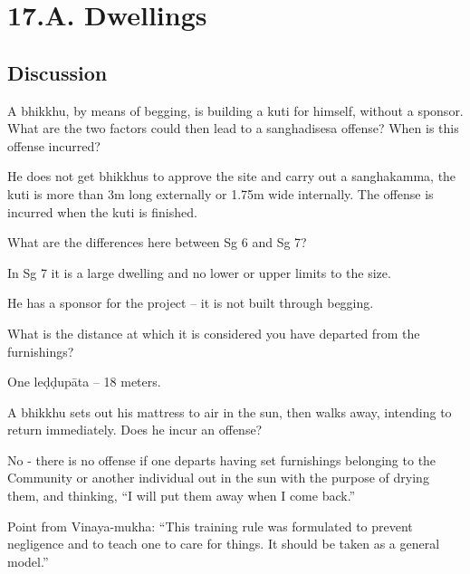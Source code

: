\chapter{17.A. Dwellings}
\renewcommand*{\theChapterTitle}{17.A. Dwellings}

\section*{Discussion}


A bhikkhu, by means of begging, is building a kuti for himself, without a
sponsor. What are the two factors could then lead to a sanghadisesa offense?
When is this offense incurred?

\begin{solution}
  He does not get bhikkhus to approve the site and carry out a sanghakamma, the
  kuti is more than 3m long externally or 1.75m wide internally. The offense is
  incurred when the kuti is finished.
\end{solution}

\bigskip


What are the differences here between Sg 6 and Sg 7?

\begin{solution}
  In Sg 7 it is a large dwelling and no lower or upper limits to the size.

  He has a sponsor for the project – it is not built through begging. 
\end{solution}

\bigskip


What is the distance at which it is considered you have departed from the furnishings?

\begin{solution}
  One leḍḍupāta -- 18 meters.
\end{solution}

\bigskip

A bhikkhu sets out his mattress to air in the sun, then walks away,
intending to return immediately. Does he incur an offense?

\begin{solution}
  No - there is no offense if one departs having set furnishings belonging to
  the Community or another individual out in the sun with the purpose of drying
  them, and thinking, “I will put them away when I come back.”

  Point from Vinaya-mukha: “This training rule was formulated to prevent
  negligence and to teach one to care for things. It should be taken as a
  general model.”
\end{solution}

